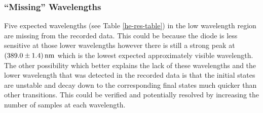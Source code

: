 \documentclass[10pt, twocolumn]{article}
\theoremstyle{definition}
\begin{document}
\subsubsection{``Missing'' Wavelengths}
Five expected wavelengths (see Table \ref{he-res-table}) in the low wavelength region are missing from the recorded data.
This could be because the diode is less sensitive at those lower wavelengths\autocite{diode-manufacturer} however there is
still a strong peak at $\qty{389\pm1.4}{\nano\meter}$ which is the lowest expected approximately visible wavelength.
The other possibility which better explains the lack of these wavelengths and the lower wavelength that was detected in the recorded data 
is that the initial states are unstable and decay down to the corresponding final states much quicker than other transitions. 
This could be verified and potentially resolved by increasing the number of samples at each wavelength.
\end{document}
